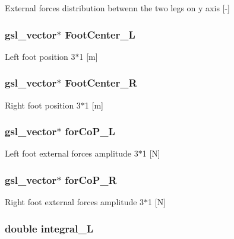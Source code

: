 External forces distribution betwenn the two legs on y axis \mbox{[}-\/\mbox{]} \hypertarget{struct_state_a7ff3e7422300d409b859408677fe0430}{
\subsubsection[{Foot\-Center\-\_\-\-L}]{\setlength{\rightskip}{0pt plus 5cm}gsl\-\_\-vector$\ast$ Foot\-Center\-\_\-\-L}}\label{struct_state_a7ff3e7422300d409b859408677fe0430}
Left foot position 3$\ast$1 \mbox{[}m\mbox{]} \hypertarget{struct_state_a51184d897ab6397cf45b437fb882b8b1}{
\subsubsection[{Foot\-Center\-\_\-\-R}]{\setlength{\rightskip}{0pt plus 5cm}gsl\-\_\-vector$\ast$ Foot\-Center\-\_\-\-R}}\label{struct_state_a51184d897ab6397cf45b437fb882b8b1}
Right foot position 3$\ast$1 \mbox{[}m\mbox{]} \hypertarget{struct_state_a19d113450a14578f13b0ba9d4877f1b7}{
\subsubsection[{for\-Co\-P\-\_\-\-L}]{\setlength{\rightskip}{0pt plus 5cm}gsl\-\_\-vector$\ast$ for\-Co\-P\-\_\-\-L}}\label{struct_state_a19d113450a14578f13b0ba9d4877f1b7}
Left foot external forces amplitude 3$\ast$1 \mbox{[}N\mbox{]} \hypertarget{struct_state_a9bfd73cabe3e218b5e5079b181cc01a1}{
\subsubsection[{for\-Co\-P\-\_\-\-R}]{\setlength{\rightskip}{0pt plus 5cm}gsl\-\_\-vector$\ast$ for\-Co\-P\-\_\-\-R}}\label{struct_state_a9bfd73cabe3e218b5e5079b181cc01a1}
Right foot external forces amplitude 3$\ast$1 \mbox{[}N\mbox{]} \hypertarget{struct_state_a44f97c1460cb92c4aedb1cb49e34c0f7}{
\subsubsection[{integral\-\_\-\-L}]{\setlength{\rightskip}{0pt plus 5cm}double integral\-\_\-\-L}}\label{struct_state_a44f97c1460cb92c4aedb1cb49e34c0f7}
